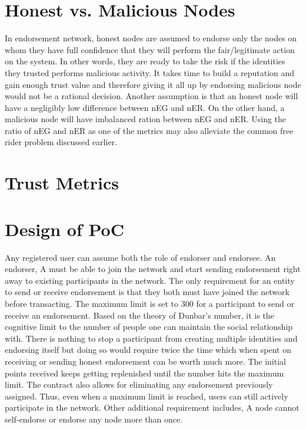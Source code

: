 \section{Honest vs. Malicious Nodes}
In endorsement network, honest nodes are assumed to endorse only the
nodes on whom they have full confidence that they will perform the
fair/legitimate action on the system. In other words, they are ready
to take the risk if the identities they trusted performs malicious
activity. It takes time to build a reputation and gain enough trust value
and therefore giving it all up by endorsing malicious node would not
be a rational decision. Another assumption is that an honest node will
have a negligibly low difference between nEG and nER. On the other hand,
a malicious node will have imbalanced ration between nEG and nER. Using
the ratio of nEG and nER as one of the metrics may also alleviate the
common free rider problem discussed earlier.

\section{Trust Metrics}

\section{Design of PoC}

Any registered user can assume both the role of endorser and endorsee. An
endorser, A must be able to join the network and start sending endorsement
right away to existing participants in the network. The only requirement for an
entity to send or receive endorsement is that they both must have joined the
network before transacting.  The maximum limit is set to 300 for a participant
to send or receive an endorsement. Based on the theory of Dunbar's number, it
is the cognitive limit to the number of people one can maintain the social
relationship with. There is nothing to stop a participant from creating
multiple identities and endorsing itself but doing so would require twice the
time which when spent on receiving or sending honest endorsement can be worth
much more.  The initial points received keeps getting replenished until the
number hits the maximum limit. The contract also allows for eliminating any
endorsement previously assigned. Thus, even when a maximum limit is reached,
users can still actively participate in the network.  Other additional
requirement includes, A node cannot self-endorse or endorse any node more than
once. 





